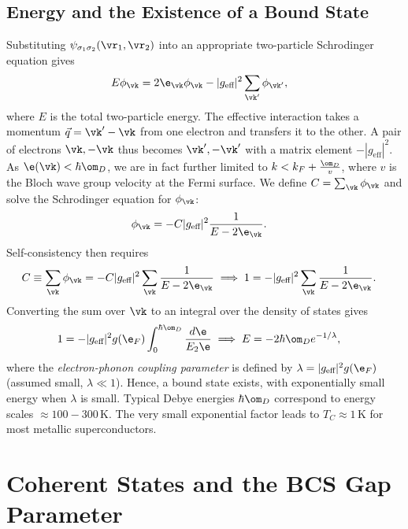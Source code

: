 \documentclass[a4paper, 11pt, normalem]{report}
\begin{document}
\section{Energy and the Existence of a Bound State}
Substituting $\psi_{\sigma_1\sigma_2}(\vr_1,\vr_2)$ into an appropriate two-particle Schrodinger equation gives
\begin{align}
    E\phi_{\vk} &= 2\e_{\vk}\phi_{\vk}-|g_{\text{eff}}|^2\sum_{\vk'}\phi_{\vk'},
\end{align}
where $E$ is the total two-particle energy.
The effective interaction takes a momentum $\vec{q}=\vk'-\vk$ from one electron and transfers it to the other.
A pair of electrons $\vk,-\vk$ thus becomes $\vk',-\vk'$ with a matrix element $-|g_{\text{eff}}|^2$.
As $\e(\vk)<\hbar\om_D$, we are in fact further limited to $k<k_F+\frac{\om_D}{v}$, where $v$ is the Bloch wave group velocity at the Fermi surface.
We define $C=\sum_{\vk}\phi_{\vk}$ and solve the Schrodinger equation for $\phi_{\vk}$:
\begin{align}
    \phi_{\vk} &= -C|g_{\text{eff}}|^2\frac{1}{E-2\e_{\vk}}.
\end{align}
Self-consistency then requires
\begin{align}
    C &\equiv \sum_{\vk} \phi_{\vk} = -C|g_{\text{eff}}|^2\sum_{\vk}\frac{1}{E-2\e_{\vk}} \implies 1 = -|g_{\text{eff}}|^2\sum_{\vk}\frac{1}{E-2\e_{\vk}}.
\end{align}
Converting the sum over $\vk$ to an integral over the density of states gives
\begin{align}
    1 &= -|g_{\text{eff}}|^2g(\e_F)\int_0^{\hbar\om_D} \frac{d\e}{E_2\e} \implies E = -2\hbar\om_De^{-1/\lambda},
\end{align}
where the \emph{electron-phonon coupling parameter} is defined by $\lambda=|g_{\text{eff}}|^2g(\e_F)$ (assumed small, $\lambda\ll1$).
Hence, a bound state exists, with exponentially small energy when $\lambda$ is small.
Typical Debye energies $\hbar\om_D$ correspond to energy scales $\approx100-300\,$K.
The very small exponential factor leads to $T_C\approx1\,$K for most metallic superconductors.

\chapter{Coherent States and the BCS Gap Parameter}
\end{document}

